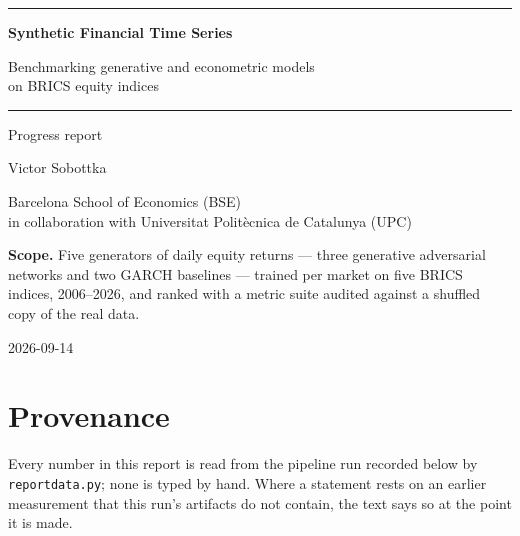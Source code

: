 \documentclass[11pt,a4paper]{article}
\makeatletter
\DeclareRobustCommand{\_}{\ifmmode\nfss@text{\textunderscore}\else\textunderscore\allowbreak\fi}
\makeatother
\begin{document}
\begin{titlepage}
\thispagestyle{empty}
\setlength{\parindent}{0pt}

\vspace*{3.2cm}
{\sffamily\color{Accent}\rule{\linewidth}{0.8pt}\par\vspace{0.9cm}
{\fontsize{30}{36}\selectfont\bfseries Synthetic Financial Time Series\par}
\vspace{0.5cm}
{\LARGE Benchmarking generative and econometric models\\[2pt] on BRICS equity indices\par}
\vspace{0.9cm}\rule{\linewidth}{0.8pt}\par}
\vspace{0.9cm}
{\sffamily\Large Progress report\par}
\vspace{2.6cm}
{\large Victor Sobottka\par}
\vspace{0.3cm}
{\normalsize Barcelona School of Economics (BSE)\\ in collaboration with Universitat Polit\`ecnica de Catalunya (UPC)\par}
\vfill
{\sffamily\small\textbf{Scope.} Five generators of daily equity returns --- three generative adversarial networks and two GARCH baselines --- trained per market on five BRICS indices, 2006--2026, and ranked with a metric suite audited against a shuffled copy of the real data.\par}
\vspace{0.7cm}
{\sffamily\small 2026-09-14\par}
\end{titlepage}
\setcounter{page}{2}

\tableofcontents
\clearpage

\section*{Provenance}
\label{sec:provenance}
Every number in this report is read from the pipeline run recorded below by \texttt{report\_data.py}; none is typed by hand. Where a statement rests on an earlier measurement that this run's artifacts do not contain, the text says so at the point it is made.
\end{document}
